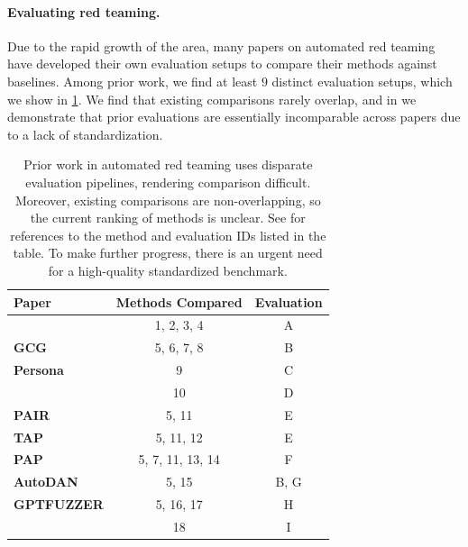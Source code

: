 \paragraph{Evaluating red teaming.}
Due to the rapid growth of the area, many papers on automated red teaming have developed their own evaluation setups to compare their methods against baselines. Among prior work, we find at least $9$ distinct evaluation setups, which we show in \cref{tab:prior_comparisons_and_evaluations}. We find that existing comparisons rarely overlap, and in  we demonstrate that prior evaluations are essentially incomparable across papers due to a lack of standardization.




\begin{table}[t]
\caption{Prior work in automated red teaming uses disparate evaluation pipelines, rendering comparison difficult. Moreover, existing comparisons are non-overlapping, so the current ranking of methods is unclear. See  for references to the method and evaluation IDs listed in the table. To make further progress, there is an urgent need for a high-quality standardized benchmark.}
\label{tab:prior_comparisons_and_evaluations}
\vskip 0.15in
\centering
\begin{tabular}{@{}l cc@{}}
\toprule
\textbf{Paper} & \textbf{Methods Compared} & \textbf{Evaluation} \\
\midrule
\textbf{\citet{perez2022red}} & 1, 2, 3, 4 & A \\
\textbf{GCG \citep{zou2023universal}} & 5, 6, 7, 8 & B \\
\textbf{Persona \citep{shah2023scalable}} & 9 & C \\
\textbf{\citet{liu2023jailbreaking}} & 10 & D \\
\textbf{PAIR \citep{chao2023jailbreaking}} & 5, 11 & E  \\
\textbf{TAP \citep{mehrotra2023treeOfAttacks}} & 5, 11, 12 & E \\
\textbf{PAP \citep{zeng2024johnny}} & 5, 7, 11, 13, 14 & F \\
\textbf{AutoDAN \citep{liu2023autodan}} & 5, 15 & B, G \\
\textbf{GPTFUZZER \citep{yu2023gptfuzzer}} & 5, 16, 17 & H \\
\textbf{\citet{shen2023anything}} & 18 & I \\
\bottomrule
\end{tabular}
\vskip -0.1in
\end{table}

